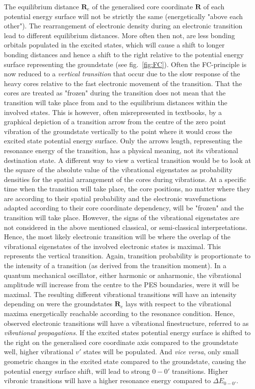 			The equilibrium distance $\bm{R}_e$ of the generalised core coordinate $\bm{R}$ of each potential energy surface will not be strictly the same (energetically "above each other"). The rearrangement of electronic density during an electronic transition lead to different equilibrium distances. More often then not, are less bonding orbitals populated in the excited states, which will cause a shift to longer bonding distances and hence a shift to the right relative to the potential energy surface representing the groundstate (see fig.~\ref{fig:FC}). Often the FC-principle is now reduced to a \emph{vertical transition} that occur due to the slow response of the heavy cores relative to the fast electronic movement of the transition. That the cores are treated as "frozen" during the transition does not mean that the transition will take place from and to the equilibrium distances within the involved states. This is however, often misrepresented in textbooks, by a graphical depiction of a transition arrow from the centre of the zero point vibration of the groundstate vertically to the point where it would cross the excited state potential energy surface. Only the arrows length, representing the resonance energy of the transition, has a physical meaning, not its vibrational destination state. A different way to view a vertical transition would be to look at the square of the absolute value of the vibrational eigenstates as probability densities for the spatial arrangement of the cores during vibrations. At a specific time when the transition will take place, the core positions, no matter where they are according to their spatial probability and the electronic wavefunctions adapted according to their core coordinate dependency, will be "frozen" and the transition will take place. However, the signs of the vibrational eigenstates are not considered in the above mentioned classical, or semi-classical interpretations. Hence, the most likely electronic transition will be where the overlap of the vibrational eigenstates of the involved electronic states is maximal. This represents the vertical transition. Again, transition probability is proportionate to the intensity of a transition (as derived from the transition moment). In a quantum mechanical oscillator, either harmonic or anharmonic, the vibrational amplitude will increase from the centre to the PES boundaries, were it will be maximal. The resulting different vibrational transitions will have an intensity depending on were the groundstates $\bm{R}_e$ lays with respect to the vibrational maxima energetically reachable according to the resonance condition. Hence, observed electronic transitions will have a vibrational finestructure, referred to as \emph{vibrational propagations}. If the excited states potential energy surface is shifted to the right on the generalised core coordinate axis compared to the groundstate well, higher vibrational $v'$ states will be populated. And \textit{vice versa}, only small geometric changes in the excited state compared to the groundstate, causing the potential energy surface shift, will lead to strong $0-0'$ transitions. Higher vibronic transitions will have a higher resonance energy compared to $\Delta E_{0-0'}$.   
  
